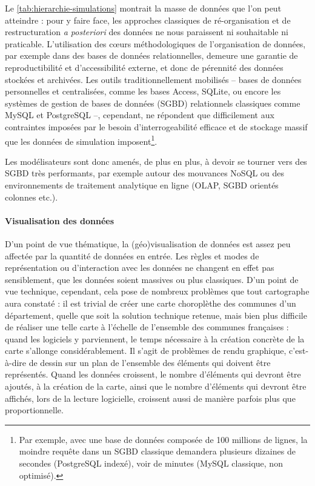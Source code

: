 \documentclass[a4paper, 12pt]{article}
\begin{document}
Le \cref{tab:hierarchie-simulations} montrait la masse de données que l'on peut atteindre : pour y faire face, les approches classiques de ré-organisation et de restructuration \textit{a posteriori} des données ne nous paraissent ni souhaitable ni praticable.
L'utilisation des cœurs méthodologiques de l'organisation de données, par exemple dans des bases de données relationnelles, demeure une garantie de reproductibilité et d'accessibilité externe, et donc de pérennité des données stockées et archivées.
Les outils traditionnellement mobilisés -- bases de données personnelles et centralisées, comme les bases \textsf{Access}, \textsf{SQLite}, ou encore les systèmes de gestion de bases de données (SGBD) relationnels classiques comme \textsf{MySQL} et \textsf{PostgreSQL} --, cependant, ne répondent que difficilement aux contraintes imposées par le besoin d'interrogeabilité efficace et de stockage massif que les données de simulation imposent\footnote{
Par exemple, avec une base de données composée de 100 millions de lignes, la moindre requête dans un SGBD classique demandera plusieurs dizaines de secondes (PostgreSQL indexé), voir de minutes (MySQL \og classique\fg{}, non optimisé).
}.

Les modélisateurs sont donc amenés, de plus en plus, à devoir se tourner vers des SGBD très performants, par exemple autour des mouvances NoSQL ou des environnements de \og traitement analytique en ligne\fg{} (OLAP, SGBD orientés colonnes etc.).


\paragraph{Visualisation des données}

D'un point de vue thématique, la (géo)visualisation de données est assez peu affectée par la quantité de données en entrée. Les règles et modes de représentation ou d'interaction avec les données ne changent en effet pas sensiblement, que les données soient massives ou plus classiques.
D'un point de vue technique, cependant, cela pose de nombreux problèmes que tout cartographe aura constaté : il est trivial de créer une carte choroplèthe des communes d'un département, quelle que soit la solution technique retenue, mais bien plus difficile de réaliser une telle carte à l'échelle de l'ensemble des communes françaises : quand les logiciels y parviennent, le temps nécessaire à la création concrète de la carte s'allonge considérablement.
Il s'agit de problèmes de \og rendu\fg{} graphique, c'est-à-dire de \og dessin\fg{} sur un plan de l'ensemble des éléments qui doivent être représentés.
Quand les données croissent, le nombre d'éléments qui devront être ajoutés, à la création de la carte, ainsi que le nombre d'éléments qui devront être affichés, lors de la lecture logicielle, croissent aussi de manière parfois plus que proportionnelle.
\end{document}
